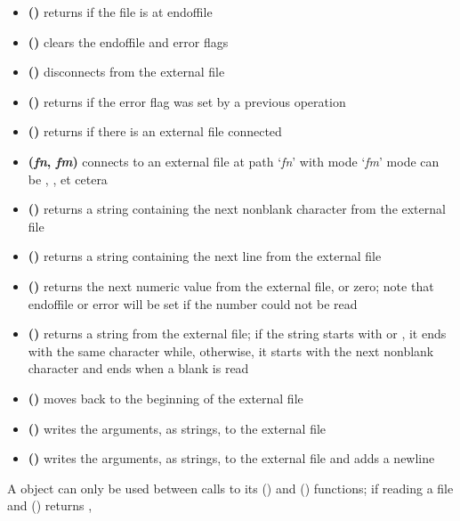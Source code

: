 \begin{itemize}
\item\textbf{()} \longDash{} returns  if the file is at
end\longDash{}of\longDash{}file
\item\exSp\textbf{()} \longDash{} clears the
end\longDash{}of\longDash{}file and error flags
\item\exSp\textbf{()} \longDash{} disconnects from the external file
\item\exSp\textbf{()} \longDash{} returns  if the error flag
was set by a previous operation
\item\exSp\textbf{()} \longDash{} returns  if there is an
external file connected
\item\exSp\textbf{(\textit{fn}, \textit{fm})} \longDash{} connects to an
external file at path `\textit{fn}' with mode `\textit{fm}' \openSq{}mode can be
, , et cetera\closeSq
\item\exSp\textbf{()} \longDash{} returns a string containing the
next non\longDash{}blank character from the external file
\item\exSp\textbf{()} \longDash{} returns a string containing the next
line from the external file
\item\exSp\textbf{()} \longDash{} returns the next numeric value from
the external file, or zero; note that end\longDash{}of\longDash{}file or error will be set
if the number could not be read
\item\exSp\textbf{()} \longDash{} returns a string from the external
file; if the string starts with  or , it ends with the same character
while, otherwise, it starts with the next non\longDash{}blank character and ends when a
blank is read
\item\exSp\textbf{()} \longDash{} moves back to the beginning of the
external file
\item\exSp\textbf{(\textellipsis)} \longDash{} writes the arguments, as
strings, to the external file
\item\exSp\textbf{(\textellipsis)} \longDash{} writes the arguments, as
strings, to the external file and adds a newline
\end{itemize}
A  object can only be used between calls to its () and
() functions; if reading a file and () returns ,
